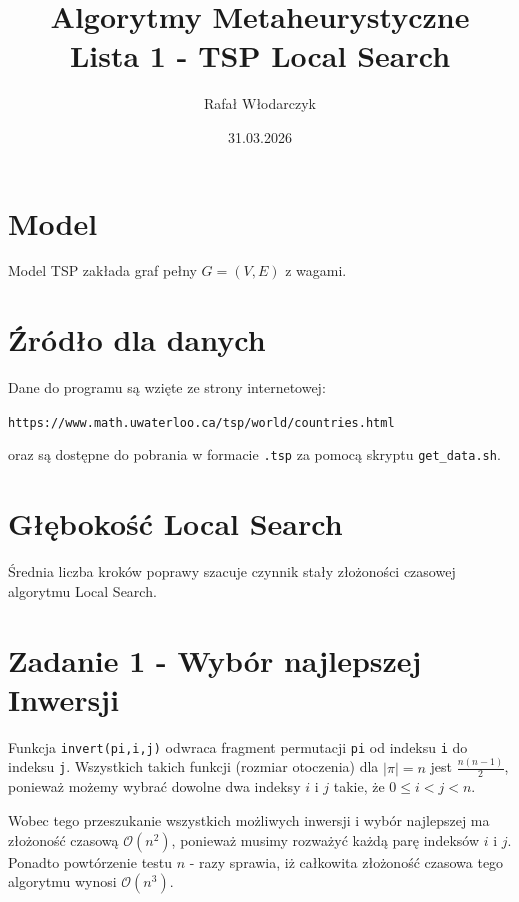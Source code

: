 \documentclass{article}
\title{Algorytmy Metaheurystyczne\\Lista 1 - TSP Local Search}
\author{Rafał Włodarczyk}
\date{31.03.2026}
\begin{document}
\maketitle

\tableofcontents

\section{Model}

Model TSP zakłada graf pełny $G=(V,E)$ z wagami.

\section{Źródło dla danych}

Dane do programu są wzięte ze strony internetowej:
\begin{center}
\texttt{https://www.math.uwaterloo.ca/tsp/world/countries.html}
\end{center}
oraz są dostępne do pobrania w formacie \texttt{.tsp} za pomocą skryptu \texttt{get\_data.sh}.

\section{Głębokość Local Search}

Średnia liczba kroków poprawy szacuje czynnik stały złożoności czasowej algorytmu Local Search.

\section{Zadanie 1 - Wybór najlepszej Inwersji}

Funkcja \texttt{invert(pi,i,j)} odwraca fragment permutacji \texttt{pi} od indeksu \texttt{i} do indeksu \texttt{j}.
Wszystkich takich funkcji (rozmiar otoczenia) dla $|\pi| = n$ jest $\frac{n(n-1)}{2}$, ponieważ możemy wybrać dowolne dwa indeksy $i$ i $j$ takie, że $0 \leq i < j < n$.

Wobec tego przeszukanie wszystkich możliwych inwersji i wybór najlepszej ma złożoność czasową $\mathcal{O}(n^2)$, ponieważ musimy rozważyć każdą parę indeksów $i$ i $j$.
Ponadto powtórzenie testu $n$ - razy sprawia, iż całkowita złożoność czasowa tego algorytmu wynosi $\mathcal{O}(n^3)$.
\end{document}
